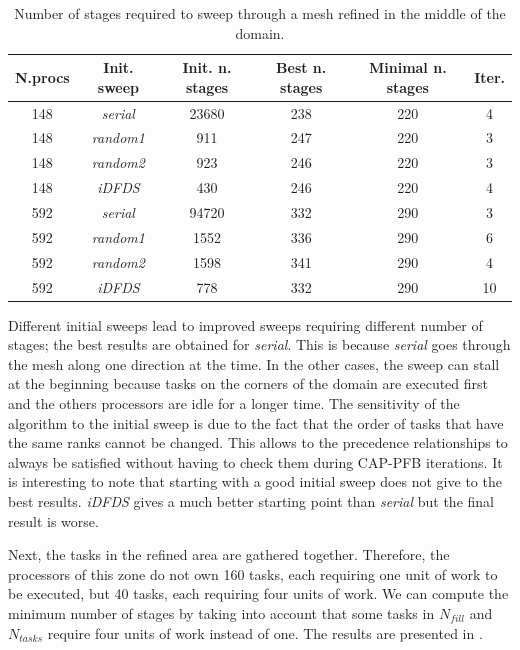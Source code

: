\documentclass{mc2015}
\renewcommand{\(}{\left(}
\renewcommand{\)}{\right)}
\renewcommand{\[}{\left[}
\renewcommand{\]}{\right]}
\begin{document}
\begin{table}[H]
  \begin{center}
    \caption{Number of stages required to sweep through a mesh refined
    in the middle of the domain.}
    \begin{tabular}{|c|c|c|c|c|c|}
      \hline
      N.procs & Init. sweep & Init. n. stages & Best n. stages & Minimal n. stages & Iter. \\
      \hline
      148 &  \emph{serial} & 23680 & 238 & 220 &  4 \\
      148 & \emph{random1} &   911 & 247 & 220 &  3 \\
      148 & \emph{random2} &   923 & 246 & 220 &  3 \\
      148 &   \emph{iDFDS} &   430 & 246 & 220 &  4 \\
      592 &  \emph{serial} & 94720 & 332 & 290 &  3 \\
      592 & \emph{random1} &  1552 & 336 & 290 &  6 \\
      592 & \emph{random2} &  1598 & 341 & 290 &  4 \\
      592 &   \emph{iDFDS} &   778 & 332 & 290 & 10 \\
      \hline
    \end{tabular}
    \label{amr_1}
  \end{center}
\end{table}

Different initial sweeps lead to improved sweeps requiring different number of
stages; the best results are obtained for \emph{serial}. This is because
\emph{serial} goes through the mesh along one direction at the time. In the
other cases, the sweep can stall at the beginning because tasks on the corners
of the domain are executed first and the others processors are idle for a longer
time. The sensitivity of the algorithm to the initial sweep is due to the fact
that the order of tasks that have the same ranks cannot be changed. This allows
to the precedence relationships to always be satisfied without
having to check them during CAP-PFB iterations. It is interesting to note that
starting with a good initial sweep does not give to the best results.
\emph{iDFDS} gives a much better starting point than \emph{serial} but the final
result is worse.

Next, the tasks in the refined area are gathered together. Therefore, the
processors of this zone do not own 160 tasks, each requiring one unit of work to
be executed, but 40 tasks, each requiring four units of work. We
can compute the minimum number of stages by taking into account that some tasks
in $N_{fill}$ and $N_{tasks}$ require four units of work instead of one. The
results are presented in .
\end{document}
